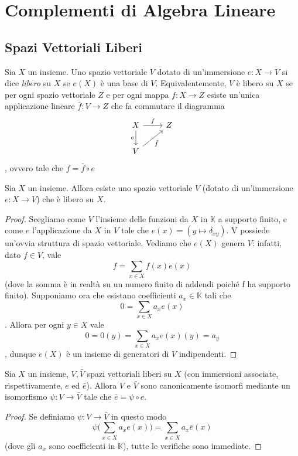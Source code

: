 \chapter{Complementi di Algebra Lineare}

\section{Spazi Vettoriali Liberi}

\begin{definition}
Sia $X$ un insieme. Uno spazio vettoriale $V$ dotato di un'immersione $e:X\to V$ si dice \emph{libero} su $X$ se $e(X)$ è una base di $V$. Equivalentemente, $V$ è libero su $X$ se per ogni spazio vettoriale $Z$ e per ogni mappa $f:X\to Z$ esiste un'unica applicazione lineare $\bar{f}:V\to Z$ che fa commutare il diagramma
$$
\begin{tikzcd}
X\arrow[r,"f"]\arrow[d,"e",swap]&Z\\
V\arrow[ru,"\bar{f}",swap]
\end{tikzcd}
$$
, ovvero tale che $f=\bar{f}\circ e$
\end{definition}

\begin{proposition}
Sia $X$ un insieme. Allora esiste uno spazio vettoriale $V$ (dotato di un'immersione $e:X\to V$) che è libero su $X$.
\end{proposition}
\begin{proof}
Scegliamo come $V$ l'insieme delle funzioni da $X$ in $\mathbb{K}$ a supporto finito, e come $e$ l'applicazione da $X$ in $V$ tale che $e(x)=(y\mapsto\delta_{xy})$. V possiede un'ovvia struttura di spazio vettoriale. Vediamo che $e(X)$ genera $V$: infatti, dato $f\in V$, vale
$$
f=\sum_{x\in X}f(x)e(x)
$$
(dove la somma è in realtà su un numero finito di addendi poiché f ha supporto finito). Supponiamo ora che esistano coefficienti $a_x\in\mathbb{K}$ tali che
$$
0=\sum_{x\in X}a_xe(x)
$$
. Allora per ogni $y\in X$ vale
$$
0=0(y)=\sum_{x\in X}a_xe(x)(y)=a_y
$$
, dunque $e(X)$ è un insieme di generatori di $V$ indipendenti.
\end{proof}

\begin{proposition}
Sia $X$ un insieme, $V\comma \bar{V}$ spazi vettoriali liberi su $X$ (con immersioni associate, rispettivamente, $e$ ed $\bar{e}$). Allora $V$ e $\bar{V}$ sono canonicamente isomorfi mediante un isomorfismo $\psi:V\to\bar{V}$ tale che $\bar{e}=\psi\circ e$.
\end{proposition}
\begin{proof}
Se definiamo $\psi:V\to\bar{V}$ in questo modo
$$
\psi\biggl(\sum_{x\in X}a_xe(x)\biggr)=\sum_{x\in X}a_x\bar{e}(x)
$$
(dove gli $a_x$ sono coefficienti in $\mathbb{K}$), tutte le verifiche sono immediate.
\end{proof}


